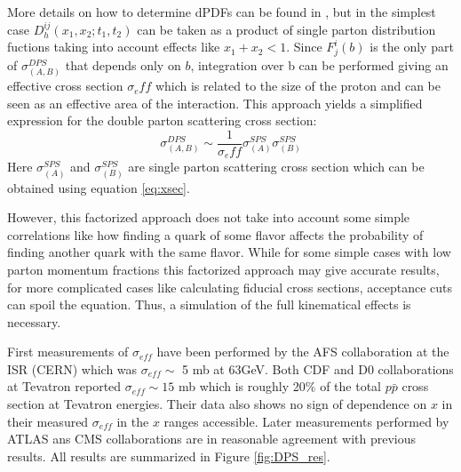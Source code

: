 \par More details on how to determine dPDFs can be found in \cite{Gaunt:2009re}, but in the simplest case $D^{ij}_h(x_1,x_2;t_1,t_2)$ can be taken as a product of single parton distribution fuctions taking into account effects like $x_1+x_2<1$. Since $F_j^i(b)$ is the only part of $\sigma_{(A,B)}^{DPS}$ that depends only on $b$, integration over b can be performed giving an effective cross section $\sigma_eff$ which is related to the size of the proton and can be seen as an effective area of the interaction. This approach yields a simplified expression for the double parton scattering cross section:
\begin{equation}
\sigma_{(A,B)}^{DPS} \sim \frac{1}{\sigma_eff} \sigma^{SPS}_{(A)} \sigma^{SPS}_{(B)}
\end{equation}
Here $\sigma^{SPS}_{(A)}$ and $\sigma^{SPS}_{(B)}$ are single parton scattering cross section which can be obtained using equation \ref{eq:xsec}.
\par However, this factorized approach does not take into account some simple correlations like how finding a quark of some flavor affects the probability of finding another quark with the same flavor. While for some simple cases with low parton momentum fractions this factorized approach may give accurate results, for more complicated cases like calculating fiducial cross sections, acceptance cuts can spoil the equation. Thus, a simulation of the full kinematical effects is necessary.
\par First measurements of $\sigma_{eff}$ have been performed by the AFS collaboration at the ISR (CERN) which was $\sigma_{eff} \sim$ 5 mb at 63GeV. Both CDF and D0 collaborations at Tevatron reported $\sigma_{eff} \sim 15$ mb which is roughly 20$\%$ of the total $p\bar{p}$ cross section at Tevatron energies. Their data also shows no sign of dependence on $x$ in their measured $\sigma_{eff}$  in the $x$ ranges accessible. Later measurements performed by ATLAS ans CMS collaborations are in reasonable agreement with previous results. All results are summarized in Figure \ref{fig:DPS_res}.
